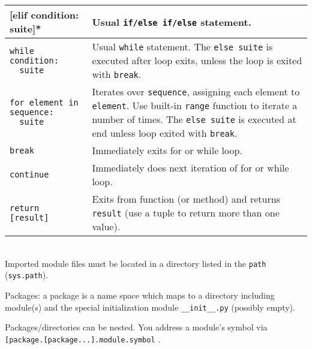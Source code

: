 \begin{longtable}{|p{5.5cm}|p{9.5cm}|}
[elif condition: suite]* & Usual {\tt if/else if/else} statement.\\
\hline
\tt while condition:\newline
\mbox{}\ \ suite & Usual {\tt while} statement. The {\tt else suite} is executed after 
           loop exits, unless the loop is exited with {\tt break}.\\
\hline
\tt for element in sequence:\newline
\mbox{}\ \ suite & Iterates over {\tt sequence}, assigning each element to {\tt element}. 
           Use built-in {\tt range} function to iterate a number of times. 
	   The {\tt else suite} is executed at end unless loop exited with {\tt break}.\\
\hline
\tt break & Immediately exits for or while loop.\\
\tt continue & Immediately does next iteration of for or while loop.\\
\hline
\tt return [result] & Exits from function (or method) and returns {\tt result} 
                     (use a tuple to return more than one value).\\
\hline
\end{longtable}

\\
Imported module files must be located in a directory listed in the {\tt path} ({\tt sys.path}).
 
Packages: a package is a name space which maps to a directory including 
module(s) and the special initialization module {\tt \_\_init\_\_.py} (possibly empty).

Packages/directories can be nested. You address a module's symbol via \\
{\tt [package.[package...].module.symbol} .

